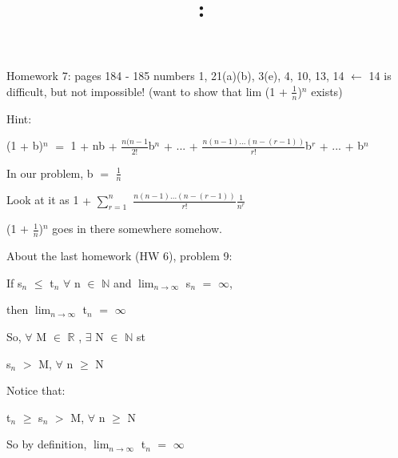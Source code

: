 \documentclass{article}
\title{
    \vspace{2in}
    \textmd{\textbf{\hmwkClass:\ \hmwkTitle}}\\
    \normalsize\vspace{0.1in}\small\vspace{0.1in}\large{\textit{\hmwkClassInstructor}}
    \vspace{3in}
}
\author{\hmwkAuthorName}
\date{}
\newcommand{\mt}[1]{\ensuremath{#1}}
\newcommand{\br}{\mt{\mathbb{R}} }       %
\newcommand{\bn}{\mt{\mathbb{N}} }       %
\newcommand{\fa}{\mt{\forall} }          %
\newcommand{\mem}{\mt{\in} }
\newcommand{\exs}{\mt{\exists} }
\newcommand{\lla}{ \mt{\longleftarrow} }  %
\newcommand{\prn}[1]{(#1)}
\newcommand{\ps}{\mt{+} }
\newcommand{\gr}{\mt{>} }
\newcommand{\lse}{\mt{\leq} }
\newcommand{\gre}{\mt{\geq} }
\newcommand{\eql}{\mt{=} }
\newcommand{\uw}[2]{#1\mt{_{#2}}}
\newcommand{\uf}[2]{#1\mt{^{#2}}}
\newcommand{\frc}[2]{\mt{\frac{#1}{#2}}}
\newcommand{\lmti}[1]{\mt{\displaystyle{\lim_{#1 \to \infty}}}}
\begin{document}
Homework 7: pages 184 - 185 numbers 1, 21(a)(b), 3(e), 4, 10, 13, 14 \lla 14 is difficult, but not impossible! (want to show that lim (1 \ps \frc{1}{n})$^n$ exists)

Hint:

\uf{\prn{1 \ps b}}{n} \eql 1 \ps nb \ps \frc{n(n - 1}{2!}\uf{b}{n} \ps ... \ps \frc{n(n - 1)... (n - (r - 1))}{r!}\uf{b}{r} \ps ... \ps \uf{b}{n}

In our problem, b \eql \frc{1}{n}

Look at it as 1 \ps $\sum_{r = 1}^n$ \frc{n(n - 1)...(n - (r - 1))}{r!}\frc{1}{n^r}

\prn{1 \ps \frc{1}{n}}$^n$ goes in there somewhere somehow.

About the last homework (HW 6), problem 9:

If \uw{s}{n} \lse \uw{t}{n} \fa n \mem \bn and \lmti{n} \uw{s}{n} \eql $\infty$,

then \lmti{n} \uw{t}{n} \eql $\infty$

So, \fa M \mem \br, \exs N \mem \bn st

\uw{s}{n} \gr M, \fa n \gre N

Notice that:

\uw{t}{n} \gre \uw{s}{n} \gr M, \fa n \gre N

So by definition, \lmti{n} \uw{t}{n} \eql $\infty$
\end{document}
